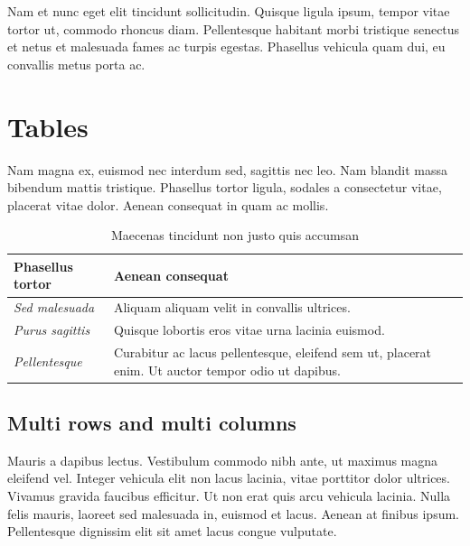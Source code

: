 	Nam et nunc eget elit tincidunt sollicitudin. Quisque ligula ipsum, tempor vitae tortor ut, commodo rhoncus diam. Pellentesque habitant morbi tristique senectus et netus et malesuada fames ac turpis egestas. Phasellus vehicula quam dui, eu convallis metus porta ac.


	\section{Tables}

	Nam magna ex, euismod nec interdum sed, sagittis nec leo. Nam blandit massa bibendum mattis tristique. Phasellus tortor ligula, sodales a consectetur vitae, placerat vitae dolor. Aenean consequat in quam ac mollis. 

	\begin{table}[H]
		\centering
		\begin{tabular}{ | m{} | m{} | }
			\hline
			\textbf{Phasellus tortor} & \textbf{Aenean consequat} \\
			\hline \hline
			\emph{Sed malesuada} & Aliquam aliquam velit in convallis ultrices. \\
			\hline
			\emph{Purus sagittis} &  Quisque lobortis eros vitae urna lacinia euismod. \\
			\hline
			\emph{Pellentesque} & Curabitur ac lacus pellentesque, eleifend sem ut, placerat enim. Ut auctor tempor odio ut dapibus. \\
			\hline
		\end{tabular}
		\caption{Maecenas tincidunt non justo quis accumsan}
		\label{tab:example-1}
	\end{table}

	\subsection{Multi rows and multi columns}

	Mauris a dapibus lectus. Vestibulum commodo nibh ante, ut maximus magna eleifend vel. Integer vehicula elit non lacus lacinia, vitae porttitor dolor ultrices. Vivamus gravida faucibus efficitur. Ut non erat quis arcu vehicula lacinia. Nulla felis mauris, laoreet sed malesuada in, euismod et lacus. Aenean at finibus ipsum. Pellentesque dignissim elit sit amet lacus congue vulputate.


